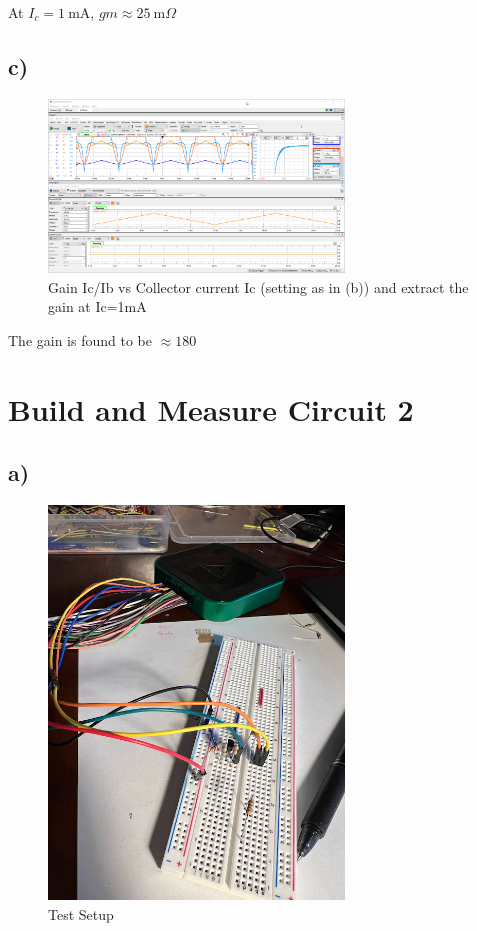 \documentclass{article}
\begin{document}
	At $I_c = \SI{1}{\mA}$, $gm \approx \SI{25}{\milli\Omega}$
	
	

	\subsection*{c)}
	
	\begin{figure}[H]
	    \centering
	    \includegraphics[width=0.7\textwidth]{3c}
	    \caption{Gain Ic/Ib vs Collector current Ic (setting as in (b)) and extract the gain at Ic=1mA}
	\end{figure}
	
	The gain is found to be $\approx 180$
	
	
	
	\section{Build and Measure Circuit 2}
	
	\subsection*{a)}
	
	\begin{figure}[H]
	    \centering
	    \includegraphics[width=0.7\textwidth]{4a-photo}
	    \caption{Test Setup}
	\end{figure}
	
\end{document}
